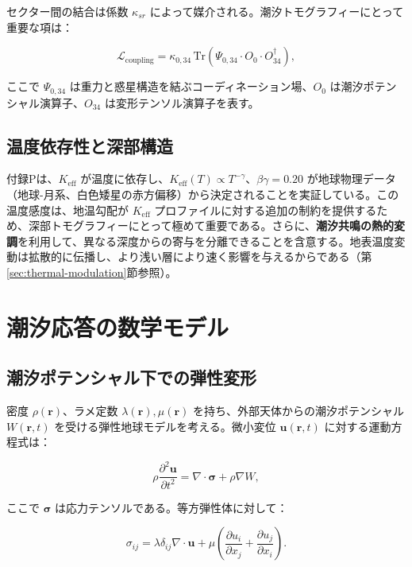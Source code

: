 \documentclass[12pt,a4paper]{article}
\theoremstyle{remark}
\newcommand{\Keff}{K_{\mathrm{eff}}}
\begin{document}
	セクター間の結合は係数 \(\kappa_{sr}\) によって媒介される。潮汐トモグラフィーにとって重要な項は：
	
	\begin{equation}
		\mathcal{L}_{\text{coupling}} = \kappa_{0,34} \, \mathrm{Tr}\left(\Psi_{0,34} \cdot O_0 \cdot O_{34}^\dagger\right),
		\label{eq:coupling}
	\end{equation}
	
	ここで \(\Psi_{0,34}\) は重力と惑星構造を結ぶコーディネーション場、\(O_0\) は潮汐ポテンシャル演算子、\(O_{34}\) は変形テンソル演算子を表す。
	
	\subsection{温度依存性と深部構造}
	
	付録Pは、\(\Keff\) が温度に依存し、\(\Keff(T) \propto T^{-\gamma}\)、\(\beta\gamma = 0.20\) が地球物理データ（地球-月系、白色矮星の赤方偏移）から決定されることを実証している。この温度感度は、地温勾配が \(K_{\mathrm{eff}}\) プロファイルに対する追加の制約を提供するため、深部トモグラフィーにとって極めて重要である。さらに、\textbf{潮汐共鳴の熱的変調}を利用して、異なる深度からの寄与を分離できることを含意する。地表温度変動は拡散的に伝播し、より浅い層により速く影響を与えるからである（第\ref{sec:thermal-modulation}節参照）。
	
	\section{潮汐応答の数学モデル}
	\label{sec:model}
	
	\subsection{潮汐ポテンシャル下での弾性変形}
	
	密度 \(\rho(\mathbf{r})\)、ラメ定数 \(\lambda(\mathbf{r}), \mu(\mathbf{r})\) を持ち、外部天体からの潮汐ポテンシャル \(W(\mathbf{r},t)\) を受ける弾性地球モデルを考える。微小変位 \(\mathbf{u}(\mathbf{r},t)\) に対する運動方程式は：
	
	\begin{equation}
		\rho \frac{\partial^2 \mathbf{u}}{\partial t^2} = \nabla \cdot \boldsymbol{\sigma} + \rho \nabla W,
		\label{eq:motion}
	\end{equation}
	
	ここで \(\boldsymbol{\sigma}\) は応力テンソルである。等方弾性体に対して：
	
	\begin{equation}
		\sigma_{ij} = \lambda \delta_{ij} \nabla \cdot \mathbf{u} + \mu \left(\frac{\partial u_i}{\partial x_j} + \frac{\partial u_j}{\partial x_i}\right).
		\label{eq:stress}
	\end{equation}
	
\end{document}
